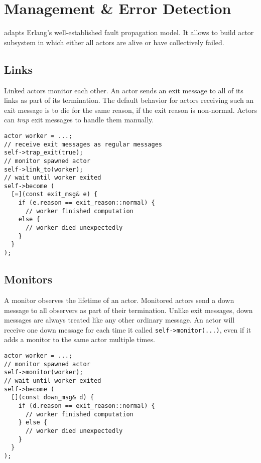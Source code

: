 \section{Management \& Error Detection}

\lib adapts Erlang's well-established fault propagation model.
It allows to build actor subsystem in which either all actors are alive or have collectively failed.

\subsection{Links}

Linked actors monitor each other.
An actor sends an exit message to all of its links as part of its termination.
The default behavior for actors receiving such an exit message is to die for the same reason, if the exit reason is non-normal.
Actors can \textit{trap} exit messages to handle them manually.

\begin{lstlisting}
actor worker = ...;
// receive exit messages as regular messages
self->trap_exit(true);
// monitor spawned actor
self->link_to(worker);
// wait until worker exited
self->become (
  [=](const exit_msg& e) {
    if (e.reason == exit_reason::normal) {
      // worker finished computation
    else {
      // worker died unexpectedly
    }
  }
);
\end{lstlisting}

\subsection{Monitors}
\label{monitors}

A monitor observes the lifetime of an actor.
Monitored actors send a down message to all observers as part of their termination.
Unlike exit messages, down messages are always treated like any other ordinary message.
An actor will receive one down message for each time it called \lstinline^self->monitor(...)^, even if it adds a monitor to the same actor multiple times.

\begin{lstlisting}
actor worker = ...;
// monitor spawned actor
self->monitor(worker);
// wait until worker exited
self->become (
  [](const down_msg& d) {
    if (d.reason == exit_reason::normal) {
      // worker finished computation
    } else {
      // worker died unexpectedly
    }
  }
);
\end{lstlisting}

